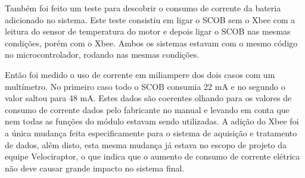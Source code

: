 Também foi feito um teste para descobrir o consumo de corrente da bateria adicionado no sistema. Este teste consistiu em ligar o SCOB sem o Xbee com a leitura do sensor de temperatura do motor e depois ligar o SCOB nas mesmas condições, porém com o Xbee. Ambos os sistemas estavam com o mesmo código no microcontrolador, rodando nas mesmas condições.

Então foi medido o uso de corrente em miliampere dos dois casos com um multímetro. No primeiro caso todo o SCOB consumia 22 mA e no segundo o valor saltou para 48 mA. Estes dados são coerentes olhando para os valores de consumo de corrente dados pelo fabricante no manual \cite{xbeeuserguide} e levando em conta que nem todas as funções do módulo estavam sendo utilizadas. A adição do Xbee foi a única mudança feita especificamente para o sistema de aquisição e tratamento de dados, além disto, esta mesma mudança já estava no escopo de projeto da equipe Velociraptor, o que indica que o aumento de consumo de corrente elétrica não deve causar grande impacto no sistema final.

